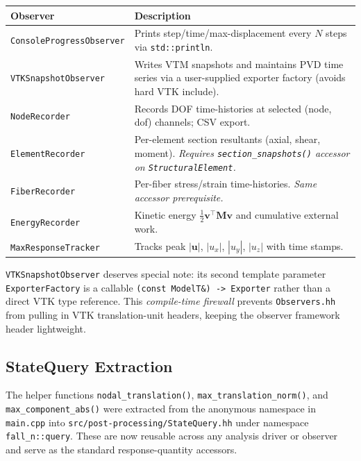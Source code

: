 \begin{center}
\small
\begin{tabular}{lp{7cm}}
\toprule
\textbf{Observer} & \textbf{Description} \\
\midrule
\texttt{ConsoleProgressObserver} &
  Prints step/time/max-displacement every $N$ steps via
  \texttt{std::println}. \\
\texttt{VTKSnapshotObserver} &
  Writes VTM snapshots and maintains PVD time series via a
  user-supplied exporter factory (avoids hard VTK include). \\
\texttt{NodeRecorder} &
  Records DOF time-histories at selected (node, dof) channels;
  CSV export. \\
\texttt{ElementRecorder} &
  Per-element section resultants (axial, shear, moment).
  \emph{Requires \texttt{section\_snapshots()} accessor on
  \texttt{StructuralElement}.} \\
\texttt{FiberRecorder} &
  Per-fiber stress/strain time-histories.
  \emph{Same accessor prerequisite.} \\
\texttt{EnergyRecorder} &
  Kinetic energy $\frac{1}{2}\mathbf{v}^{\!\top}\!\mathbf{M}\mathbf{v}$
  and cumulative external work. \\
\texttt{MaxResponseTracker} &
  Tracks peak $|\mathbf{u}|$, $|u_x|$, $|u_y|$, $|u_z|$ with
  time stamps. \\
\bottomrule
\end{tabular}
\end{center}

\texttt{VTKSnapshotObserver} deserves special note: its second template
parameter \texttt{ExporterFactory} is a callable
\texttt{(const ModelT\&) -> Exporter} rather than a direct VTK type
reference.  This \emph{compile-time firewall} prevents
\texttt{Observers.hh} from pulling in VTK translation-unit headers,
keeping the observer framework header lightweight.

\subsection{StateQuery Extraction}
\label{sec:impl-state-query}

The helper functions \texttt{nodal\_translation()},
\texttt{max\_translation\_norm()}, and \texttt{max\_component\_abs()}
were extracted from the anonymous namespace in \texttt{main.cpp} into
\texttt{src/post-processing/StateQuery.hh} under namespace
\texttt{fall\_n::query}.  These are now reusable across any analysis
driver or observer and serve as the standard response-quantity accessors.

